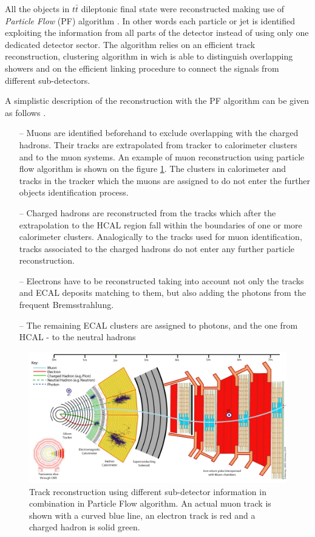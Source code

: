 All the objects in $t\bar{t}$ dileptonic final state were reconstructed making use of \textit{Particle Flow} (PF)
algorithm \cite{Beaudette:2014cea}. In other words each particle or jet is identified exploiting the information from all parts
of the detector instead of using only one dedicated detector sector. The algorithm relies on an efficient track reconstruction,
clustering algorithm in wich is able to distinguish overlapping showers and on the efficient linking procedure to connect 
the signals from different sub-detectors.

A simplistic description of the reconstruction with the PF algorithm can be given as follows \cite{Beaudette:2014cea}.

\begin{itemize}
 \item [--] Muons are identified beforehand to exclude overlapping with the charged hadrons. Their tracks are extrapolated
 from tracker to calorimeter clusters and to the muon systems. An example of muon reconstruction using particle flow algorithm is 
 shown on the figure \ref{fig:PFmuons}. The clusters in calorimeter and tracks in the tracker which the muons are assigned to
 do not enter the further objects identification process.
 \item [--] Charged hadrons are reconstructed from the tracks which after the extrapolation to the HCAL region fall within the boundaries
 of one or more calorimeter clusters. Analogically to the tracks used for muon identification, tracks associated to the charged 
 hadrons do not enter any further particle reconstruction.
 \item [--] Electrons have to be reconstructed taking into account not only the tracks and ECAL deposits matching to them, but also
 adding the photons from the frequent Bremsstrahlung.
 \item [--] The remaining ECAL clusters are assigned to photons, and the one from HCAL - to the neutral hadrons
\end{itemize}

\begin{figure}[t]
  \centering
  \includegraphics[width=1.0\textwidth]{04_event_reconstruction/plots/CMS_Slice.png}
  \caption{Track reconstruction using different sub-detector information in combination in Particle Flow algorithm. An actual
  muon track is shown with a curved blue line, an electron track is red and a charged hadron is solid green.}
  \label{fig:PFmuons}
\end{figure}

